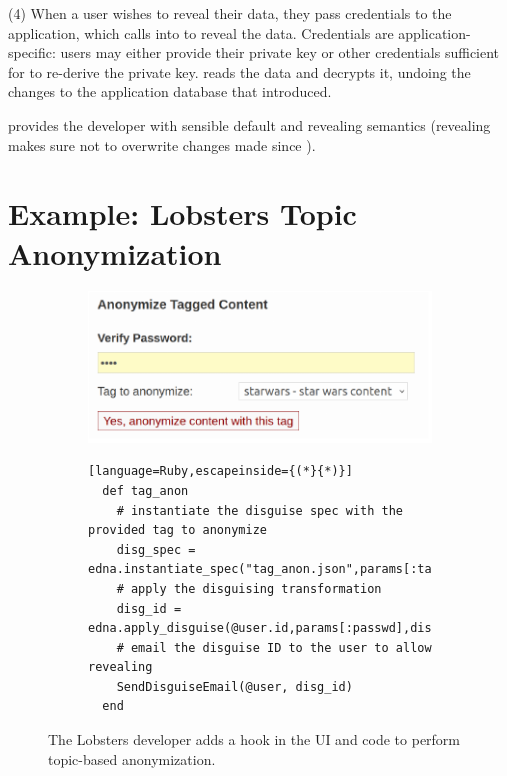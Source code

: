 %
(4) When a user wishes to reveal their \xxed data, they pass credentials
to the application, which calls into \sys to reveal the data.
%
Credentials are application-specific: users may either provide their private
key or other credentials sufficient for \sys to re-derive the private key.
%
\sys reads the \xxed data and decrypts it, undoing the changes to the
application database that \xxing introduced.
%

%
\sys provides the developer with sensible default \xxing and revealing
semantics (\eg revealing makes sure not to overwrite changes made since
\xxing).


\section{Example: Lobsters Topic Anonymization}
\label{s:design:lobsters}

\begin{figure}[h]
  \centering
  \begin{subfigure}[h]{0.5\columnwidth}
  \includegraphics[width=\columnwidth]{figs/lobsters_catanon}
  \end{subfigure}
  \begin{subfigure}[h]{\columnwidth}
  \begin{lstlisting}[language=Ruby,escapeinside={(*}{*)}]
  def tag_anon
    # instantiate the disguise spec with the provided tag to anonymize
    disg_spec = edna.instantiate_spec("tag_anon.json",params[:tag])
    # apply the disguising transformation
    disg_id = edna.apply_disguise(@user.id,params[:passwd],disg_spec)
    # email the disguise ID to the user to allow revealing
    SendDisguiseEmail(@user, disg_id)
  end
  \end{lstlisting}
  \end{subfigure}
  \vspace*{-1em}
    \caption[Hook to invoke topic-based anonymization.]{The Lobsters developer adds a hook in the UI and code to perform
      topic-based anonymization.}
  \label{f:lobsters_hook}
  \end{figure}

